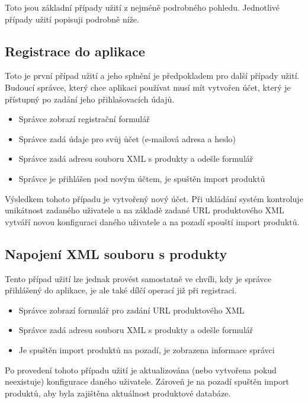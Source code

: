 \documentclass[FM,DP]{tulthesis}
\begin{document}
Toto jsou základní případy užití z nejméně podrobného pohledu. Jednotlivé případy užití 
popisuji podrobně níže.

\subsection{Registrace do aplikace}

Toto je první případ užití a jeho splnění je předpokladem pro další případy užití. Budoucí
správce, který chce aplikaci používat musí mít vytvořen účet, který je přístupný po zadání
jeho přihlašovacích údajů.

\begin{itemize}
\item Správce zobrazí registrační formulář
\item Správce zadá údaje pro svůj ůčet (e-mailová adresa a heslo)
\item Správce zadá adresu souboru XML s produkty a odešle formulář
\item Správce je přihlášen pod novým účtem, je spuštěn import produktů
\end{itemize}

Výsledkem tohoto případu je vytvořený nový účet. Při ukládání systém kontroluje unikátnost
zadaného uživatele a na základě zadané URL produktového XML vytváří novou konfiguraci
daného uživatele a na pozadí spouští import produktů.

\subsection{Napojení XML souboru s produkty}

Tento případ užití lze jednak provést samostatně ve chvíli, kdy je správce přihlášený
do aplikace, je ale také dílčí operací již při registraci.

\begin{itemize}
\item Správce zobrazí formulář pro zadání URL produktového XML
\item Správce zadá adresu souboru XML s produkty a odešle formulář
\item Je spuštěn import produktů na pozadí, je zobrazena informace správci
\end{itemize}

Po provedení tohoto případu užití je aktualizována (nebo vytvořena pokud neexistuje) 
konfigurace daného uživatele. Zároveň je na pozadí spuštěn import produktů, aby byla
zajištěna aktuálnost produktové databáze.
\end{document}
